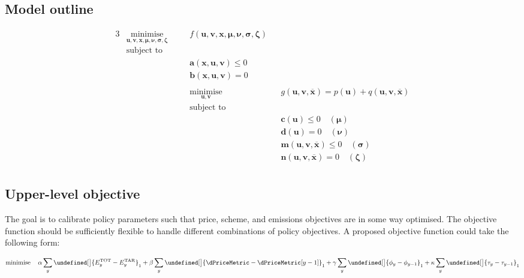 \documentclass{article}
\let\norm\undefined %
\DeclarePairedDelimiter\norm{\lVert}{\rVert}
\DeclareMathOperator*{\minimise}{minimise}
\begin{document}
\subsection{Model outline}
\begin{alignat}{3}
& \minimise\limits_{\bm{u}, \bm{v}, \bm{x}, \bm{\mu}, \bm{\nu}, \bm{\sigma}, \bm{\zeta}} \quad && f\left(\bm{u}, \bm{v}, \bm{x}, \bm{\mu}, \bm{\nu}, \bm{\sigma}, \bm{\zeta}\right) \nonumber\\
& \textrm{subject to} \nonumber\\
& && \bm{a}(\bm{x}, \bm{u}, \bm{v}) \leq 0\\
& && \bm{b}(\bm{x}, \bm{u}, \bm{v}) = 0\\
& \\\nonumber
& && \minimise\limits_{\bm{u}, \bm{v}} \quad && g(\bm{u}, \bm{v}, \bm{\overline{x}}) = p(\bm{u}) + q(\bm{u}, \bm{v}, \bm{\overline{x}}) \nonumber\\
& && \textrm{subject to} \nonumber\\
& && && \bm{c}(\bm{u}) \leq 0 \quad \left(\bm{\mu}\right) \\
& && && \bm{d}(\bm{u}) = 0 \quad \left(\bm{\nu}\right)\\
& && && \bm{m}(\bm{u}, \bm{v}, \bm{\overline{x}}) \leq 0 \quad \left(\bm{\sigma}\right)\\
& && && \bm{n}(\bm{u}, \bm{v}, \bm{\overline{x}}) = 0 \quad \left(\bm{\zeta}\right)\\\nonumber
\end{alignat}

\subsection{Upper-level objective}
The goal is to calibrate policy parameters such that price, scheme, and emissions objectives are in some way optimised. The objective function should be sufficiently flexible to handle different combinations of policy objectives. A proposed objective function could take the following form:

\begin{equation}
	\minimise\limits_{} \quad \alpha \sum\limits_{\iYear} \norm[\big]{\vEmissionsTotal - \cEmissionsTarget}_{1} + \beta \sum\limits_{\iYear} \norm[\big]{\dPriceMetric - \dPriceMetric[\iYear - 1]}_{1} + \gamma \sum\limits_{\iYear} \norm[\big]{\vBaseline -\vBaseline[\iYear-1]}_{1} + \kappa \sum\limits_{\iYear} \norm[\big]{\vPermitPrice - \vPermitPrice[\iYear - 1]}_{1}
\end{equation}
\end{document}
